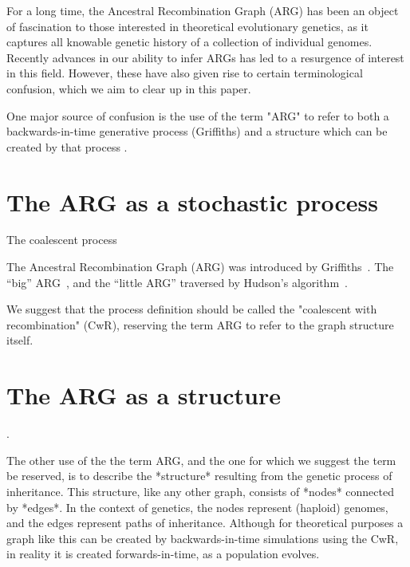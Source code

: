 \documentclass{article}
\begin{document}
For a long time, the Ancestral Recombination Graph (ARG) has been an object of fascination
to those interested in theoretical evolutionary genetics, as it captures all knowable genetic
history of a collection of individual genomes. Recently advances in our ability to infer ARGs
has led to a resurgence of interest in this field. However, these have also given rise to certain 
terminological confusion, which we aim to clear up in this paper.

One major source of confusion is the use of the term "ARG" to refer to both a backwards-in-time
generative process (Griffiths) and a structure which can be created by that process \citep[e.g.][]{minichiello2006mapping,mathieson2020ancestry}. 

\section*{The ARG as a stochastic process}
The coalescent
process~\citep{kingman1982coalescent,kingman1982genealogy,hudson1983testing,
tajima1983evolutionary}

The Ancestral Recombination Graph (ARG) was introduced by
Griffiths~\citep{griffiths1991two,griffiths1997ancestral}.
The ``big'' ARG~\citep{ethier1990two},
and the ``little ARG'' traversed by
Hudson's algorithm~\citep{hudson1983properties}.

We suggest that the process definition should be called the "coalescent with recombination" (CwR), reserving the term ARG to refer to the graph structure itself.

\section*{The ARG as a structure}

\citep[e.g.][]{minichiello2006mapping,mathieson2020ancestry}.


The other use of the the term ARG, and the one for which we suggest the term be reserved, 
is to describe the *structure* resulting from the genetic process of inheritance. This structure, 
like any other graph, consists of *nodes* connected by *edges*. In the context of genetics, the
nodes represent (haploid) genomes, and the edges represent paths of inheritance. Although for
theoretical purposes a graph like this can be created by backwards-in-time simulations using
the CwR, in reality it is created forwards-in-time, as a population evolves.
\end{document}
